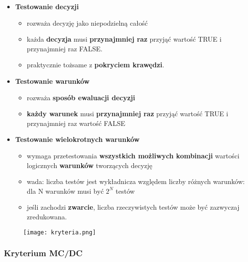 \documentclass[../main.tex]{subfiles}
\begin{document}
    \begin{itemize}
        \item \textbf{Testowanie decyzji}
        \begin{itemize}
            \item rozważa decyzję jako niepodzielną całość
            \item każda \textbf{decyzja} musi \textbf{przynajmniej raz} przyjąć wartość TRUE i przynajmniej raz FALSE.
            \item praktycznie tożsame z \textbf{pokryciem krawędzi}.
        \end{itemize}

        \item \textbf{Testowanie warunków}
        \begin{itemize}
            \item rozważa \textbf{sposób ewaluacji decyzji}
            \item \textbf{każdy warunek} musi \textbf{przynajmniej raz} przyjąć wartość TRUE i przynajmniej raz wartość FALSE
        \end{itemize}

        \item \textbf{Testowanie wielokrotnych warunków}
        \begin{itemize}
            \item wymaga przetestowania \textbf{wszystkich możliwych kombinacji} wartości
            logicznych \textbf{warunków} tworzących decyzję
            \item wada: liczba testów jest wykładnicza względem liczby różnych
            warunków: dla N warunków musi być $2^N$ testów
            \item jeśli zachodzi \textbf{zwarcie}, liczba rzeczywistych testów może być zazwyczaj zredukowana.

        \end{itemize}
    \end{itemize}

    \begin{figure}[H]
        \texttt{[image: kryteria.png]}
    \end{figure}

    \subsubsection{Kryterium MC/DC}
\end{document}
